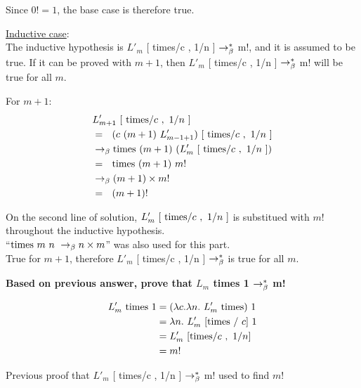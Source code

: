 \documentclass{article}
\begin{document}
\begin{Large}
		Since $0! = 1$, the base case is therefore true.
		\newline
		
		\underline{Inductive case}: \\
		
		The inductive hypothesis is $L'_m$ [ times/c , 1/n ] $\rightarrow_\beta^*$  m!, and it is assumed to be true.
		If it can be proved with $m+1$, then $L'_m$ [ times/c , 1/n ] $\rightarrow_\beta^*$  m! will be true for all $m$.
		
		For $m+1$:
		\begin{align*}
			&L_{m+1}^\prime \ [\ \tim / c \ , \ 1/n \ ] \\
			&= \saq (c \ (m+1) \ L_{m-1+1}^\prime ) \ [\ \tim / c \ , \ 1/n \ ] \\
			&\equals \tim \ (m+1) \ ( L_m^\prime \ [\ \tim / c \ , \ 1/n \ ]) \\
			&= \saq \tim \ (m+1) \ m! \\
			&\equals (m+1) \times  m! \\
			&= \saq (m+1)!
		\end{align*}
		
		On the second line of solution, $L_m^\prime \ [\ \text{times} / c \ , \ 1/n \ ]$ is substitued with $m!$ throughout the inductive hypothesis. \\
		
		``$\text{times} \ m \ n \ \rightarrow_\beta n \times m$'' was also used for this part. \\
		
		True for $m+1$, therefore $L'_m$ [ times/c , 1/n ] $\rightarrow_\beta^*$ is true for all $m$. \\
		\newline
		
		\textbf{Based on previous answer, prove that $L_m$ times 1  $\rightarrow_\beta^*$ m!}
		
		\begin{align*}
			L_m^\prime \ \tim \ 1 &= (\la c.\la n. \ L_m^\prime \ \tim) \ 1 \\
			&= \la n. \ L_m^\prime \ [\tim \ / \ c] \ 1 \\
			&= L_m^\prime \ [\tim /c \ , \ 1/n] \\
			&= m!
		\end{align*}
		
		Previous proof that $L'_m$ [ times/c , 1/n ] $\rightarrow_\beta^*$  m! used to find $m!$
	\end{Large}
	\newpage
	
	
	
\end{document}
